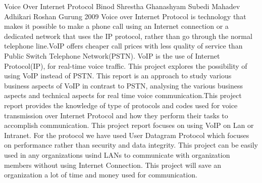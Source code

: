  \begin{conf-abstract}[]
{Voice Over Internet Protocol}
{
Binod Shrestha
Ghanashyam Subedi
Mahadev Adhikari
Roshan Gurung
}
{2009}
Voice over Internet Protocol is technology that makes it possible to make a phone call using an Internet connection or a dedicated network  that uses the IP protocol,
rather than  go through the normal telephone line.VoIP offers cheaper call prices with less quality of service than Public Switch Telephone Network(PSTN). VoIP is 
the use of Internet Protocol(IP), for real-time voice traffic. This project explores the possibility of using VoIP instead of PSTN. This report is an approach to study 
various business aspects of VoIP in contrast to PSTN, analysing the various business aspects and technical aspects for real time voice communication.This project report
 provides the knowledge of type of protocols and codes used for voice transmission over Internet Protocol and how they perform their tasks to accomplish communication.
This project report focuses on using VoIP on Lan or Intranet. For the protocol we have used User Datagram Protocol which focuses on performance rather than security 
and data integrity. This project can be easily used in any organizations usind LANs to communicate with organization members without using Internet Connection. This 
project will save an organization a lot of time and money used for communication.  
  \end{conf-abstract}